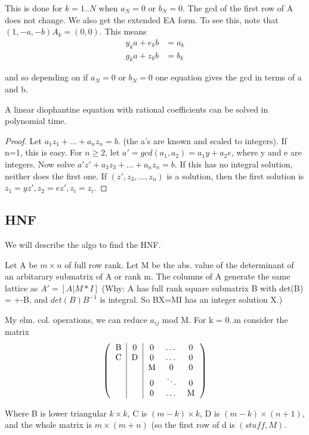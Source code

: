 This is done for $k=1..N$ when $a_N=0$ or $b_N=0$. The gcd of the first row of A does not change. We also get the extended EA form. To see this, note that $(1, -a, -b)A_k = (0,0)$. This means
\begin{align*}
	y_ka + e_kb & = a_k \\
	g_ka + z_kb & = b_k
\end{align*}

and so depending on if $a_N = 0$ or $b_N = 0$ one equation gives the gcd in terms of a and b.


\begin{corollary}
A linear diophantine equation with rational coefficients can be solved in polynomial time.
\end{corollary}
\begin{proof}
Let $a_1z_1 + \dots + a_nz_n = b$. (the a's are known and scaled to integers). If n=1, this is easy. For $n \geq 2$, let $a' = gcd(a_1, a_2) = a_1 y + a_2 e$, where y and e are integers. 
Now solve $a'z' + a_3z_3 + \dots + a_nz_n = b$. If this has no integral solution, neither does the first one. If $(z', z_3, \dots, z_n)$  is a solution, then the first solution is $z_1= yz', z_2 = ez', z_i = z_i$.
\end{proof}


\subsection{HNF}

We will describe the algo to find the HNF.

Let A be $m \times n$ of full row rank. Let M be the abs. value of the determinant of an arbitarary submatrix of A or rank m. The columns of A generate the same lattice as $A' = [A | M*I]$ (Why: A has full rank square submatrix B with det(B) = +-B, and $det(B) B^{-1}$ is integral. So BX=MI has an integer solution X.)

My elm. col. operations, we can reduce $a_{ij}$ mod M. For k = 0..m consider the matrix
\[
\left( \begin{tabular}{c|c|ccc}
B &0 & 0 & \dots & 0\\
C &D & 0& \dots & 0\\
   &   & M& 0      & 0 \\
   &   & 0& $\ddots$ & 0  \\
   &   & 0& \dots  &M
\end{tabular}\right)
\]

Where B is lower triangular $k \times k$, C is $(m-k)\times k$, D is $(m-k) \times (n+1)$, and the whole matrix is $m \times (m+n)$ (so the first row of d is $(stuff, M)$.

